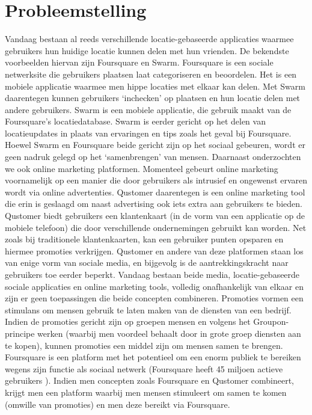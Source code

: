 \chapter{Probleemstelling}
Vandaag bestaan al reeds verschillende locatie-gebaseerde applicaties waarmee gebruikers hun huidige locatie kunnen delen met hun vrienden. 
De bekendste voorbeelden hiervan zijn Foursquare\cite{foursquare} en Swarm\cite{swarm}.
Foursquare is een sociale netwerksite die gebruikers plaatsen laat categoriseren en beoordelen.
Het is een mobiele applicatie waarmee men hippe locaties met elkaar kan delen. Met Swarm daarentegen kunnen gebruikers `inchecken' op plaatsen en hun locatie delen met andere gebruikers. Swarm is een mobiele applicatie, die gebruik maakt van de Foursquare's locatiedatabase. Swarm is eerder gericht op het delen van locatieupdates in plaats van ervaringen en tips zoals het geval bij Foursquare.
Hoewel Swarm en Foursquare beide gericht zijn op het sociaal gebeuren, wordt er geen nadruk gelegd op het `samenbrengen' van mensen. 
Daarnaast onderzochten we ook online marketing platformen. Momenteel gebeurt online marketing voornamelijk op een manier die door gebruikers als intrusief en ongewenst ervaren wordt via online advertenties. Qustomer\cite{qustomer} daarentegen is een online marketing tool die erin is geslaagd om naast advertising ook iets extra aan gebruikers te bieden. Qustomer biedt gebruikers een klantenkaart (in de vorm van een applicatie op de mobiele telefoon) die door verschillende ondernemingen gebruikt kan worden. Net zoals bij traditionele klantenkaarten, kan een gebruiker punten opsparen en hiermee promoties verkrijgen. Qustomer en andere van deze platformen staan los van enige vorm van sociale media, en bijgevolg is de aantrekkingskracht naar gebruikers toe eerder beperkt.
Vandaag bestaan beide media, locatie-gebaseerde sociale applicaties en online marketing tools, volledig onafhankelijk van elkaar en zijn er geen toepassingen die beide concepten combineren. 
Promoties vormen een stimulans om mensen gebruik te laten maken van de diensten van een bedrijf. Indien de promoties gericht zijn op groepen mensen en volgens het Groupon-principe werken (waarbij men voordeel behaalt door in grote groep diensten aan te kopen), kunnen promoties een middel zijn om mensen samen te brengen.
Foursquare is een platform met het potentieel om een enorm publiek te bereiken wegens zijn functie als sociaal netwerk (Foursquare heeft 45 miljoen actieve gebruikers \cite{users}).
Indien men concepten zoals Foursquare en Qustomer combineert, krijgt men een platform waarbij men mensen stimuleert om samen te komen (omwille van promoties) en men deze bereikt via Foursquare.
